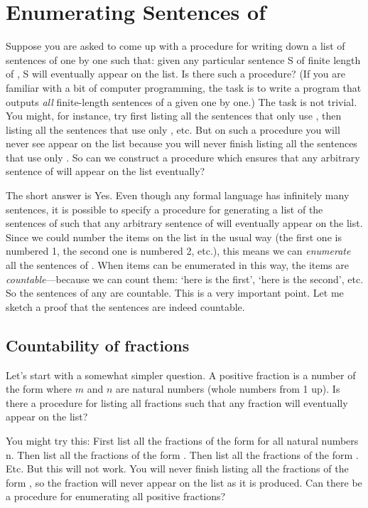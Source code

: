 \section{Enumerating Sentences of \lL{}}\label{sec:enumeratingSentences}


Suppose you are asked to come up with a procedure for writing down a list of 
sentences of \lL{} one by one such that: given any particular sentence S of 
finite length  of \lL{}, S will eventually appear on the list. Is there such a 
procedure?  (If you are familiar with a bit of computer programming, the task is 
to write a program that outputs \emph{all} finite-length sentences of a given 
\lL{} one by one.) The task is not trivial. You might, for instance, try first 
listing all the sentences that only use \p{\land}, then listing all the 
sentences that use only \p{\lor}, etc. But on such a procedure you will never 
see  appear on the list because you will never finish listing all the 
sentences that use only \p{\land}.  So can we construct a procedure which 
ensures that any arbitrary sentence of \lL{} will appear on the list eventually?

The short answer is Yes. Even though any formal language \lL{} has infinitely 
many sentences, it is possible to specify a procedure for generating a list of 
the sentences of \lL{} such that any arbitrary sentence of \lL{} will eventually 
appear on the list. Since we could number the items on the list in the usual way 
(the first one is numbered 1, the second one is numbered 2, etc.), this means we 
can \emph{enumerate} all the sentences of \lL{}. When items can be enumerated in 
this way, the items are \emph{countable}---because we can count them: `here is 
the first',
 `here is the second', etc.  So the sentences of any \lL{} are countable.  This 
 is a very important point. Let me sketch a proof that the sentences are indeed 
 countable. 

 \subsection{Countability of fractions}\label{secCF}

Let's start with a somewhat simpler question. A positive fraction is a number of 
the form  where $m$ and $n$ are natural numbers (whole numbers 
from 1 up). Is there a procedure for listing all fractions such that any 
fraction will eventually appear on the list? 

You might try this: First list all the fractions of the form  for 
all natural numbers n. Then list all the fractions of the form .  
Then list all the fractions of the form . Etc. But this will not 
work. You will never finish listing all the fractions of the form     
,
so the fraction  will never appear on the list as it is produced. 
Can there be a procedure for enumerating all positive fractions?

